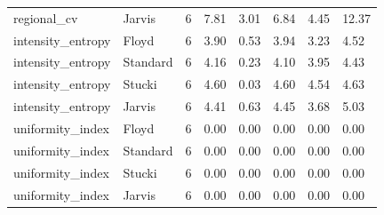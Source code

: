 \begin{tabular}{llrlllll}
regional_cv & Jarvis & 6 & 7.81 & 3.01 & 6.84 & 4.45 & 12.37 \\
intensity_entropy & Floyd & 6 & 3.90 & 0.53 & 3.94 & 3.23 & 4.52 \\
intensity_entropy & Standard & 6 & 4.16 & 0.23 & 4.10 & 3.95 & 4.43 \\
intensity_entropy & Stucki & 6 & 4.60 & 0.03 & 4.60 & 4.54 & 4.63 \\
intensity_entropy & Jarvis & 6 & 4.41 & 0.63 & 4.45 & 3.68 & 5.03 \\
uniformity_index & Floyd & 6 & 0.00 & 0.00 & 0.00 & 0.00 & 0.00 \\
uniformity_index & Standard & 6 & 0.00 & 0.00 & 0.00 & 0.00 & 0.00 \\
uniformity_index & Stucki & 6 & 0.00 & 0.00 & 0.00 & 0.00 & 0.00 \\
uniformity_index & Jarvis & 6 & 0.00 & 0.00 & 0.00 & 0.00 & 0.00 \\
\bottomrule
\end{tabular}

